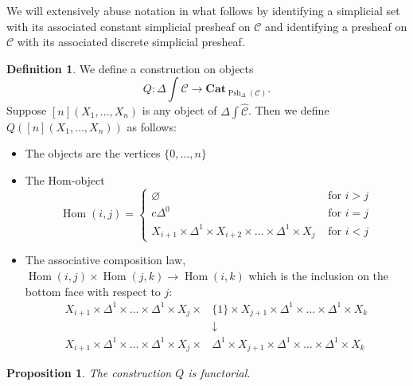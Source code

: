 \documentclass[a4paper]{article}
\numberwithin{equation}{subsection}
\theoremstyle{plain}   %
\newtheorem{prop}[equation]{Proposition}
\theoremstyle{definition}
\newtheorem{defn}[equation]{Definition}
\theoremstyle{remark}
\theoremstyle{plain}
\newcommand{\Cat}{\ensuremath{\mathbf{Cat}}}
\DeclareMathOperator{\Hom}{Hom}
\newcommand{\psh}[1]{\ensuremath{\widehat{#1}}}
\providecommand{\C}{}
\renewcommand{\C}{\ensuremath{\mathcal{C}}}
\newcommand{\spsh}{\ensuremath{\operatorname{Psh}_\Delta(\mathcal{C})}}
\begin{document}
We will extensively abuse notation in what follows by identifying a simplicial set with its associated constant simplicial presheaf on \(\C\) and identifying a presheaf on \(\C\) with its associated discrete simplicial presheaf.
\begin{defn}
	We define a construction on objects \[Q:\Delta\int\psh{\C}\to \Cat_{\spsh}.\] Suppose \([n](X_1,\dots, X_n)\) is any object of \(\Delta\int\psh{\C}\). Then we define \(Q([n](X_1,\dots,X_n))\) as follows:
	\begin{itemize}
		\item The objects are the vertices \(\{0,\dots,n\}\)
		\item The Hom-object
		      \[\Hom(i,j)=
			      \begin{cases}
				      \varnothing                                                & \text{ for } i>j \\
				      c\Delta^0                                                & \text{ for } i=j \\
				      X_{i+1} \times \Delta^1 \times X_{i+2}\times \dots \times \Delta^1 \times X_j & \text{ for } i<j
			      \end{cases}
		      \]
		\item The associative composition law, \(\Hom(i,j)\times \Hom(j,k)\to \Hom(i,k)\) which is the inclusion on the bottom face with respect to \(j\):
		      \begin{align*}
			      X_{i+1}\times \Delta^1\times\dots\times\Delta^1\times X_j \times & \{1\}\times X_{j+1} \times \Delta^1\times\dots\times\Delta^1\times X_k    \\
			                                                                       & \downarrow                                                                \\
			      X_{i+1}\times \Delta^1\times\dots\times\Delta^1\times X_j\times  & \Delta^1\times X_{j+1} \times \Delta^1\times\dots\times\Delta^1\times X_k
		      \end{align*}
	\end{itemize}
\end{defn}
\begin{prop} The construction \(Q\) is functorial.
\end{prop}
\end{document}

